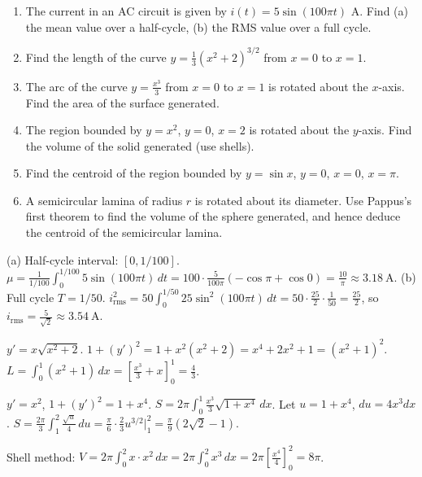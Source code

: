 \documentclass[11pt]{article}
\begin{document}
\begin{exercice}
\begin{enumerate}
\item The current in an AC circuit is given by $i(t)=5\sin(100\pi t)$ A. Find (a) the mean value over a half-cycle, (b) the RMS value over a full cycle.
\item Find the length of the curve $y=\frac{1}{3}(x^2+2)^{3/2}$ from $x=0$ to $x=1$.
\item The arc of the curve $y=\frac{x^3}{3}$ from $x=0$ to $x=1$ is rotated about the $x$-axis. Find the area of the surface generated.
\item The region bounded by $y=x^2$, $y=0$, $x=2$ is rotated about the $y$-axis. Find the volume of the solid generated (use shells).
\item Find the centroid of the region bounded by $y=\sin x$, $y=0$, $x=0$, $x=\pi$.
\item A semicircular lamina of radius $r$ is rotated about its diameter. Use Pappus's first theorem to find the volume of the sphere generated, and hence deduce the centroid of the semicircular lamina.
\end{enumerate}
\end{exercice}

\begin{corrige}[Exercise 1]
(a) Half-cycle interval: $[0, 1/100]$. $\mu = \frac{1}{1/100}\int_0^{1/100} 5\sin(100\pi t)\,dt = 100\cdot\frac{5}{100\pi}(-\cos\pi+\cos0) = \frac{10}{\pi}\approx 3.18\ \mathrm{A}$.
(b) Full cycle $T=1/50$. $i_{\mathrm{rms}}^2 = 50\int_0^{1/50} 25\sin^2(100\pi t)\,dt = 50\cdot\frac{25}{2}\cdot\frac{1}{50} = \frac{25}{2}$, so $i_{\mathrm{rms}} = \frac{5}{\sqrt{2}}\approx 3.54\ \mathrm{A}$.
\end{corrige}

\begin{corrige}[Exercise 2]
$y' = x\sqrt{x^2+2}$. $1+(y')^2 = 1+x^2(x^2+2) = x^4+2x^2+1 = (x^2+1)^2$. $L = \int_0^1 (x^2+1)\,dx = \left[\frac{x^3}{3}+x\right]_0^1 = \frac{4}{3}$.
\end{corrige}

\begin{corrige}[Exercise 3]
$y' = x^2$, $1+(y')^2 = 1+x^4$. $S = 2\pi\int_0^1 \frac{x^3}{3}\sqrt{1+x^4}\,dx$. Let $u=1+x^4$, $du=4x^3dx$. $S = \frac{2\pi}{3}\int_1^2 \frac{\sqrt{u}}{4}\,du = \frac{\pi}{6}\cdot\frac{2}{3}u^{3/2}\big|_1^2 = \frac{\pi}{9}(2\sqrt{2}-1)$.
\end{corrige}

\begin{corrige}[Exercise 4]
Shell method: $V = 2\pi\int_0^2 x\cdot x^2\,dx = 2\pi\int_0^2 x^3\,dx = 2\pi\left[\frac{x^4}{4}\right]_0^2 = 8\pi$.
\end{corrige}
\end{document}
